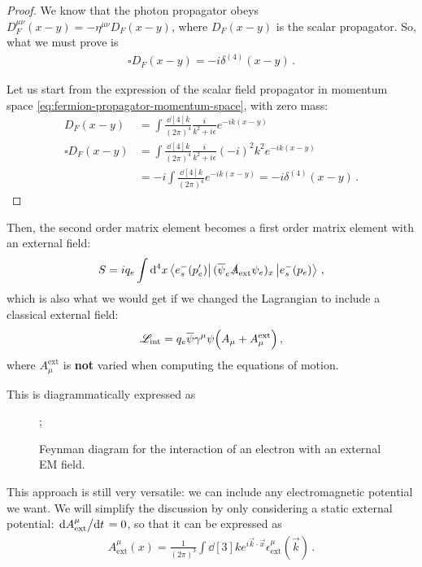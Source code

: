 \documentclass[main.tex]{subfiles}
\begin{document}
\begin{proof}
We know that the photon propagator obeys \(D_F^{\mu \nu }(x-y) = - \eta^{\mu \nu } D_F (x-y)\), where \(D_F(x-y)\) is the scalar propagator. So, what we must prove is 
%
\begin{align}
\square D_F(x-y) = -i \delta^{(4)} (x-y)
\,.
\end{align}

Let us start from the expression of the scalar field propagator in momentum space \eqref{eq:fermion-propagator-momentum-space}, with zero mass: 
%
\begin{align}
D_F (x-y) &= \int \frac{ \dd[4]{k}}{(2\pi )^{4}} \frac{i}{k^2+ i \epsilon } e^{-ik (x-y)} \\
\square D_F (x-y) &= \int \frac{ \dd[4]{k}}{(2\pi )^{4}} \frac{i}{k^2+ i \epsilon } (-i)^2 k^2 e^{-ik (x-y)}  \\
&= - i \int \frac{\dd[4]{k}}{(2\pi )^{4}} e^{-ik(x-y)} = - i \delta^{(4)}(x-y)
\,.
\end{align}
\end{proof}

Then, the second order matrix element becomes a first order matrix element with an external field: 
%
\begin{align}
S = i q_e \int \dd[4]{x}
\bra{e^{-}_{s} (p'_e)} 
(\overline{\psi}_{e} \slashed{A} _{\text{ext}} \psi_{e})_x 
\ket{e^{-}_{s}(p_e)}
\,,
\end{align}
%
which is also what we would get if we changed the Lagrangian to include a classical external field: 
%
\begin{align}
\mathscr{L} _{\text{int}} = q_e \overline{\psi} \gamma^{\mu } \psi \qty(A_{\mu} + A_{\mu }^{\text{ext}})
\,,
\end{align}
%
where \(A_{\mu }^{\text{ext}}\) is \textbf{not} varied when computing the equations of motion. 

This is diagrammatically expressed as 
\begin{figure}[ht]
\centering
{};
\caption{Feynman diagram for the interaction of an electron with an external EM field.}
\label{fig:external-EM-field-diagram}
\end{figure}

This approach is still very versatile: we can include any electromagnetic potential we want. 
We will simplify the discussion by only considering a static external potential: \(\dv*{A^{\mu } _{\text{ext}}}{t} = 0\), so that it can be expressed as 
%
\begin{align}
A^{\mu } _{\text{ext}} (x) = \frac{1}{(2\pi )^3} \int \dd[3]{k} e^{i \vec{k} \cdot \vec{x}} \epsilon^{\mu } _{\text{ext}} (\vec{k})
\,.
\end{align}
\end{document}
